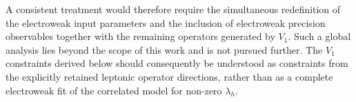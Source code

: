 A consistent treatment would therefore require the simultaneous
redefinition of the electroweak input parameters and the inclusion of
electroweak precision observables together with the remaining operators
generated by $V_1$.  Such a global analysis lies beyond the scope of this
work and is not pursued further.  The $V_1$ constraints derived below
should consequently be understood as constraints from the explicitly
retained leptonic operator directions, rather than as a complete
electroweak fit of the correlated model for non-zero $\lambda_h$.

